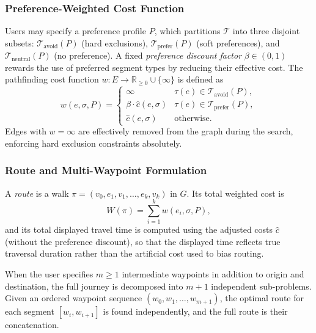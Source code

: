 \documentclass[a4paper,10pt]{amsart}
\begin{document}
\subsubsection{Preference-Weighted Cost Function}

Users may specify a preference profile $P$, which partitions $\mathcal{T}$ into three disjoint subsets: $\mathcal{T}_{\text{avoid}}(P)$ (hard exclusions), $\mathcal{T}_{\text{prefer}}(P)$ (soft preferences), and $\mathcal{T}_{\text{neutral}}(P)$ (no preference).
A fixed \emph{preference discount factor} $\beta \in (0, 1)$ rewards the use of preferred segment types by reducing their effective cost.
The pathfinding cost function $w : E \to \mathbb{R}_{\geq 0} \cup \{\infty\}$ is defined as
\begin{equation} \label{eq:weighted_cost}
    w(e, \sigma, P) =
    \begin{cases}
        \infty                        & \tau(e) \in \mathcal{T}_{\text{avoid}}(P), \\
        \beta \cdot \hat{c}(e,\sigma) & \tau(e) \in \mathcal{T}_{\text{prefer}}(P), \\
        \hat{c}(e,\sigma)             & \text{otherwise.}
    \end{cases}
\end{equation}
Edges with $w = \infty$ are effectively removed from the graph during the search, enforcing hard exclusion constraints absolutely.

\subsubsection{Route and Multi-Waypoint Formulation}

A \emph{route} is a walk $\pi = (v_0, e_1, v_1, \ldots, e_k, v_k)$ in $G$.
Its total weighted cost is
\begin{equation} \label{eq:route_cost}
    W(\pi) = \sum_{i=1}^{k} w(e_i, \sigma, P),
\end{equation}
and its total displayed travel time is computed using the adjusted costs $\hat{c}$ (without the preference discount), so that the displayed time reflects true traversal duration rather than the artificial cost used to bias routing.

When the user specifies $m \geq 1$ intermediate waypoints in addition to origin and destination, the full journey is decomposed into $m+1$ independent sub-problems.
Given an ordered waypoint sequence $(w_0, w_1, \ldots, w_{m+1})$, the optimal route for each segment $[w_i, w_{i+1}]$ is found independently, and the full route is their concatenation.
\end{document}
